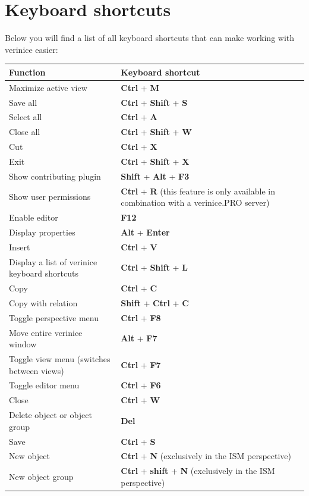 \documentclass[a4paper,10pt]{book}
\begin{document}
\section{Keyboard shortcuts}
Below you will find a list of all keyboard shortcuts that can make working with verinice easier:
\\
\begin{longtable}{| p{} | p{} |}
\hline
\textbf{Function} & \textbf{Keyboard shortcut} \\[10pt]
\hline\hline
Maximize active view & \textbf{Ctrl} + \textbf{M} \\[10pt] \hline
Save all & \textbf{Ctrl} + \textbf{Shift} + \textbf{S} \\[10pt] \hline
Select all & \textbf{Ctrl} + \textbf{A} \\[10pt] \hline
Close all & \textbf{Ctrl} + \textbf{Shift} + \textbf{W} \\[10pt] \hline
Cut & \textbf{Ctrl} + \textbf{X} \\[10pt] \hline
Exit & \textbf{Ctrl} + \textbf{Shift} + \textbf{X} \\[10pt] \hline
Show contributing plugin & \textbf{Shift} + \textbf{Alt} + \textbf{F3} \\[10pt] \hline
Show user permissions & \textbf{Ctrl} + \textbf{R} (this feature is only available in combination with a verinice.\textsc{PRO} server) \\[10pt] \hline
Enable editor & \textbf{F12} \\[10pt] \hline
Display properties & \textbf{Alt} + \textbf{Enter} \\[10pt] \hline
Insert & \textbf{Ctrl} + \textbf{V} \\[10pt] \hline
Display a list of verinice keyboard shortcuts & \textbf{Ctrl} + \textbf{Shift} + \textbf{L} \\[10pt] \hline
Copy & \textbf{Ctrl} + \textbf{C} \\[10pt] \hline
Copy with relation & \textbf{Shift} + \textbf{Ctrl} + \textbf{C} \\[10pt] \hline
Toggle perspective menu & \textbf{Ctrl} + \textbf{F8} \\[10pt] \hline
Move entire verinice window & \textbf{Alt} + \textbf{F7} \\[10pt] \hline
Toggle view menu (switches between views) & \textbf{Ctrl} + \textbf{F7} \\[10pt] \hline
Toggle editor menu & \textbf{Ctrl} + \textbf{F6} \\[10pt] \hline
Close & \textbf{Ctrl} + \textbf{W} \\[10pt] \hline
Delete object or object group & \textbf{Del} \\[10pt] \hline
Save & \textbf{Ctrl} + \textbf{S} \\[10pt] \hline
New object & \textbf{Ctrl} + \textbf{N} (exclusively in the ISM perspective) \\[10pt] \hline
New object group & \textbf{Ctrl} + \textbf{shift} + \textbf{N} (exclusively in the ISM perspective) \\[10pt] \hline


\end{longtable}
\end{document}

